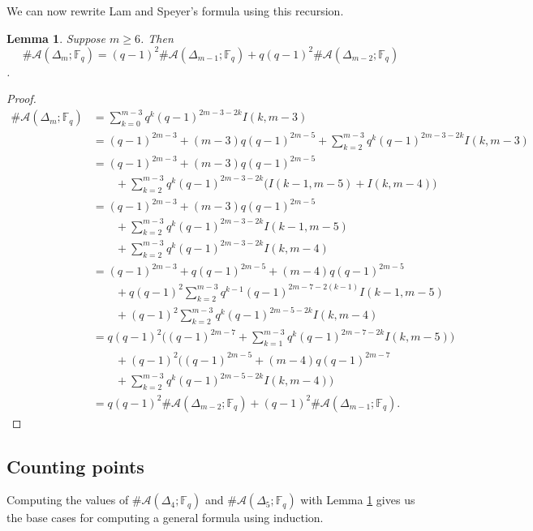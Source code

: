 \documentclass[reqno,12pt]{amsart}
\newtheorem{lemma}[thm]{Lemma}
\theoremstyle{definition}
\theoremstyle{remark}
\theoremstyle{remark}
\numberwithin{equation}{section}
\begin{document}
We can now rewrite Lam and Speyer's formula using this recursion.
\begin{lemma}\label{lem: LS recurs}
	Suppose $m\geq 6$. Then 
	\[ \#\mathcal{A}(\Delta_m ; \mathbb{F}_q) = (q-1)^2 \#\mathcal{A}(\Delta_{m-1} ; \mathbb{F}_q) + q(q-1)^2 \#\mathcal{A}(\Delta_{m-2} ; \mathbb{F}_q)\].
\end{lemma}
\begin{proof}
	\begin{align*}
		\#\mathcal{A}(\Delta_m ;\mathbb{F}_q) &= \sum_{k=0}^{m-3} q^k (q-1)^{2m-3-2k} I(k,m-3) \\
		&= (q-1)^{2m-3} + (m-3)q(q-1)^{2m-5} + \sum_{k=2}^{m-3} q^k (q-1)^{2m-3-2k} I(k,m-3) \\
		&= (q-1)^{2m-3} + (m-3)q(q-1)^{2m-5} \\ &\quad\quad+ \sum_{k=2}^{m-3} q^k (q-1)^{2m-3-2k} \big(I(k-1,m-5) + I(k,m-4) \big) \\
		&= (q-1)^{2m-3} + (m-3)q(q-1)^{2m-5} \\ &\quad\quad+ \sum_{k=2}^{m-3} q^k (q-1)^{2m-3-2k} I(k-1,m-5) \\ &\quad\quad+ \sum_{k=2}^{m-3} q^k (q-1)^{2m-3-2k} I(k,m-4) \\
		&= (q-1)^{2m-3} + q(q-1)^{2m-5} + (m-4)q(q-1)^{2m-5} \\ &\quad\quad+ q(q-1)^2 \sum_{k=2}^{m-3} q^{k-1} (q-1)^{2m-7-2(k-1)} I(k-1,m-5) \\ &\quad\quad+ (q-1)^2 \sum_{k=2}^{m-3} q^k (q-1)^{2m-5-2k} I(k,m-4) \\
		&= q(q-1)^2 \bigg((q-1)^{2m-7} + \sum_{k=1}^{m-3} q^{k} (q-1)^{2m-7-2k} I(k,m-5) \bigg) \\ &\quad\quad+ (q-1)^2 \bigg( (q-1)^{2m-5} + (m-4)q(q-1)^{2m-7} \\ &\quad\quad + \sum_{k=2}^{m-3} q^k (q-1)^{2m-5-2k} I(k,m-4) \bigg) \\
		&= q(q-1)^2 \#\mathcal{A}(\Delta_{m-2} ;\mathbb{F}_q) + (q-1)^2 \#\mathcal{A}(\Delta_{m-1} ;\mathbb{F}_q).
	\end{align*}
\end{proof}

\subsection{Counting points}

Computing the values of $\#\mathcal{A}(\Delta_4 ; \mathbb{F}_q)$ and $\#\mathcal{A}(\Delta_5 ; \mathbb{F}_q) $ with Lemma \ref{lem: LS recurs} gives us the base cases for computing a general formula using induction.
\end{document}
